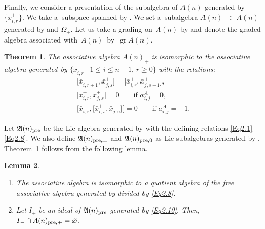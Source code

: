 \documentclass[pdftex]{sigma}
\numberwithin{equation}{section}
\newtheorem{Theorem}{Theorem}[section]
\newtheorem{Lemma}[Theorem]{Lemma}
\theoremstyle{definition}
\begin{document}
Finally, we consider a presentation of the subalgebra of $A(n)$ generated by $\bigl\{x^+_{i,r}\bigr\}$.
We take a~subspace  spanned by .
We set a~subalgebra $A(n)_+\subset A(n)$ generated by  and $\Omega_+$. Let us take a grading on~$A(n)$ by  and denote the graded algebra associated with~$A(n)$~by~$\operatorname{gr}A(n)$.
\begin{Theorem}\label{plus}
The associative algebra $A(n)_+$ is isomorphic to the associative algebra generated by $\bigl\{\bar{x}^+_{i,r}\mid 1\leq i\leq n-1,\,r\geq0\bigr\}$ with the relations:
\begin{gather*}
\bigl[\bar{x}^+_{i,r+1},\bar{x}^+_{j,s}\bigr]=\bigl[\bar{x}^+_{i,r},\bar{x}^+_{j,s+1}\bigr],\\
\bigl[\bar{x}^+_{i,r},\bar{x}^+_{j,s}\bigr]=0 \qquad \text{if }a^A_{i,j}=0,\\
\bigl[\bar{x}^+_{i,r},\bigl[\bar{x}^+_{i,s},\bar{x}^+_{j,u}\bigr]\bigr]=0 \qquad \text{if }a^A_{i,j}=-1.
\end{gather*}
\end{Theorem} %
Let $\mathfrak{A}(n)_{{\rm pre}}$ be the Lie algebra generated by  with the defining relations \eqref{Eq2.1}--\eqref{Eq2.8}. We also define $\mathfrak{A}(n)_{{\rm pre},\pm}$ and $\mathfrak{A}(n)_{{\rm pre},0}$ as Lie subalgebras generated by .
Theorem~\ref{plus} follows from the following lemma.
\begin{Lemma}\qquad
\begin{enumerate}\itemsep=0pt
\item[$(1)$] The associative algebra  is isomorphic to a quotient algebra of the free associative algebra generated by  divided by \eqref{Eq2.8}.

\item[$(2)$] Let $I_\pm$ be an ideal of $\mathfrak{A}(n)_{{\rm pre}}$ generated by \eqref{Eq2.10}. Then, $I_-\cap A(n)_{{\rm pre},+}=\varnothing$.
\end{enumerate}
\end{Lemma}
\end{document}
